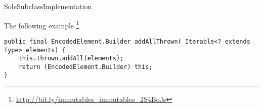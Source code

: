 \begin{pattern}{SoleSubclassImplementation}

\instances{}
The following example%
\footnote{\url{http://bit.ly/immutables_immutables_2S4BoJs}}

\begin{verbatim}
public final EncodedElement.Builder addAllThrown( Iterable<? extends Type> elements) {
    this.thrown.addAll(elements);
    return (EncodedElement.Builder) this;
}
\end{verbatim}

\detection{}

\discussion{}

\related{}

\end{pattern}